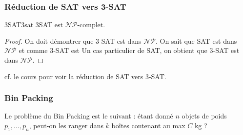 \subsubsection{Réduction de SAT vers 3-SAT}
\label{sub:reduction_de_sat_vers_3_sat}
\begin{theorem}{3SAT}{3sat}
    3SAT est $\mathcal{NP}$-complet.
\end{theorem}
\begin{proof}
    On doit démontrer que 3-SAT est dans $\mathcal{NP}$. On sait que SAT est dans $\mathcal{NP}$ et comme 3-SAT est Un
    cas particulier de SAT, on obtient que 3-SAT est dans $\mathcal{NP}$.
\end{proof}
\begin{remark}
    cf. le cours pour voir la réduction de SAT vers 3-SAT.
\end{remark}


\subsubsection{Bin Packing}
\label{sub:bin_packing}
Le problème du Bin Packing est le suivant : étant donné $n$ objets de poids $p_1,...,p_n$, peut-on les ranger dans $k$ boîtes
contenant au max $C$ kg ?\\

